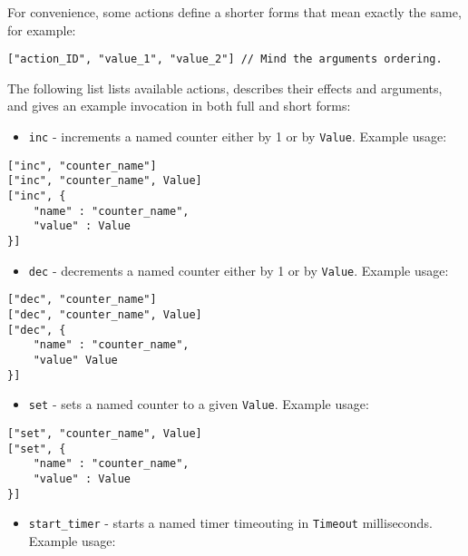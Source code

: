 \documentclass[a4paper]{article}
\begin{document}
\noindent
For convenience, some actions define a shorter forms that mean exactly the same, for example:


\begin{verbatim}
["action_ID", "value_1", "value_2"] // Mind the arguments ordering.
\end{verbatim}




\noindent
The following list lists available actions, describes their effects and arguments, and gives an example invocation in both full and short forms:


\begin{itemize}
\item \texttt{inc} - increments a named counter either by 1 or by \texttt{Value}. Example usage:
\end{itemize}

\begin{verbatim}
["inc", "counter_name"]
["inc", "counter_name", Value]
["inc", {
    "name" : "counter_name",
    "value" : Value
}]
\end{verbatim}





\begin{itemize}
\item \texttt{dec} - decrements a named counter either by 1 or by \texttt{Value}. Example usage:
\end{itemize}

\begin{verbatim}
["dec", "counter_name"]
["dec", "counter_name", Value]
["dec", {
    "name" : "counter_name",
    "value" Value
}]
\end{verbatim}





\begin{itemize}
\item \texttt{set} - sets a named counter to a given \texttt{Value}. Example usage:
\end{itemize}

\begin{verbatim}
["set", "counter_name", Value]
["set", {
    "name" : "counter_name",
    "value" : Value
}]
\end{verbatim}





\begin{itemize}
\item \texttt{start\_timer} - starts a named timer timeouting in \texttt{Timeout} milliseconds. Example usage:
\end{itemize}
\end{document}
